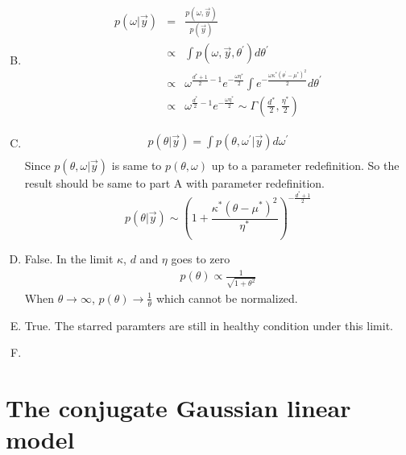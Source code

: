 \documentclass{article}
\begin{document}
\begin{enumerate}[(A)]
\begin{eqnarray}
\end{eqnarray}
\item
\begin{eqnarray}
p(\omega|\vec{y})&=&\frac{p(\omega,\vec{y})}{p(\vec{y})}\nonumber\\
&\propto&\int p(\omega,\vec{y},\theta^\prime)d\theta^\prime\nonumber\\
&\propto&\omega^{\frac{d^*+1}{2}-1}e^{-\frac{\omega\eta^*}{2}}\int e^{-\frac{\omega\kappa^*(\theta^\prime-\mu^*)^2}{2}}d\theta^\prime\nonumber\\
&\propto&\omega^{\frac{d^*}{2}-1}e^{-\frac{\omega\eta^*}{2}}\sim\Gamma(\frac{d^*}{2},\frac{\eta^*}{2})
\end{eqnarray}
\item
\begin{eqnarray}
p(\theta|\vec{y})=\int p(\theta,\omega^\prime|\vec{y})d\omega^\prime\nonumber\\
\end{eqnarray}
Since $p(\theta,\omega|\vec{y})$ is same to $p(\theta,\omega)$ up to a parameter redefinition. So the result should be same to part A with parameter redefinition.
\begin{equation}
p(\theta|\vec{y})\sim(1+\frac{\kappa^*(\theta-\mu^*)^2}{\eta^*})^{-\frac{d^*+1}{2}}
\end{equation}
\item
False. In the limit $\kappa$, $d$ and $\eta$ goes to zero
\begin{eqnarray}
p(\theta)\propto\frac{1}{\sqrt{1+\theta^2}}
\end{eqnarray}
When $\theta\rightarrow\infty$, $p(\theta)\rightarrow\frac{1}{\theta}$ which cannot be normalized.
\item
True. The starred paramters are still in healthy condition under this limit.
\item

\end{enumerate}
\section{The conjugate Gaussian linear model}
\end{document}
